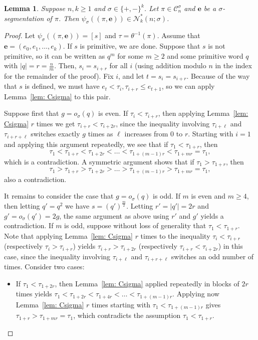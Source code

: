 \documentclass[12pt]{article}
\newcommand{\C}{\mathcal{C}}
\newcommand{\N}{\mathcal{N}}
\newcommand{\e}{\mathbf{e}}
\theoremstyle{plain}
\newtheorem{lemma}[theorem]{Lemma}
\theoremstyle{definition}
\begin{document}
\begin{lemma}\label{lem: psi}
Suppose $n,k\geq 1$ and $\sigma \in \{+,-\}^k$. Let $\pi \in \C_n^\sigma$ and $\e$ be a $\sigma$-segmentation of $\pi$. Then $\psi_\sigma((\pi,\e)) \in \N^*_k(n;\sigma)$. 
\end{lemma}
\begin{proof}
Let $\psi_\sigma((\pi,\e))=[s]$ and $\tau=\theta^{-1}(\pi)$.  Assume that $\e=(e_0,e_1,\ldots,e_k)$.  If $s$ is primitive, we are done. Suppose that $s$ is not primitive, so it can be written as $q^m$ for some $m\ge 2$ and some primitive word $q$ with $|q|=r=\frac{n}{m}$.
Then, $s_i = s_{i+r}$ for all $i$ (using addition modulo $n$ in the index for the remainder of the proof). %
Fix $i$, and let $t=s_i = s_{i+r}$. Because of the way that $s$ is defined, we must have $e_t< \tau_i,\tau_{i+r}\leq e_{t+1}$, so we can apply Lemma~\ref{lem: Csigma} to this pair.

Suppose first that $g=o_\sigma(q)$ is even.
If $\tau_i<\tau_{i+r}$, then applying Lemma~\ref{lem: Csigma} $r$ times we get $\tau_{i+r}<\tau_{i+2r}$,
since the inequality involving $\tau_{i+\ell}$ and $\tau_{i+r+\ell}$ switches exactly $g$ times as $\ell$ increases from $0$ to $r$.  Starting with $i=1$ and applying this argument repeatedly, we see that if $\tau_1<\tau_{1+r}$, then
$$\tau_1<\tau_{1+r}<\tau_{1+2r}<\dots <\tau_{1+(m-1)r}<\tau_{1+mr}=\tau_1,$$ which is a contradiction.
A symmetric argument shows that if $\tau_1>\tau_{1+r}$, then $$\tau_1>\tau_{1+r}>\tau_{1+2r}>\dots >\tau_{1+(m-1)r}>\tau_{1+mr}=\tau_1,$$ also a contradiction.

It remains to consider the case that $g=o_\sigma(q)$ is odd. If $m$ is even and $m\ge4$, then letting $q' = q^2$ we have $s = (q')^{\frac{m}{2}}$.
Letting $r'=|q'|=2r$ and $g'= o_\sigma(q')=2g$, the same argument as above using $r'$ and $g'$ yields a contradiction.
If $m$ is odd, suppose without loss of generality that $\tau_1<\tau_{1+r}$.
Note that applying Lemma~\ref{lem: Csigma} $r$ times to the inequality $\tau_i<\tau_{i+r}$ (respectively $\tau_i>\tau_{i+r}$) yields $\tau_{i+r}>\tau_{i+2r}$ (respectively $\tau_{i+r}<\tau_{i+2r}$) in this case, since the inequality involving $\tau_{i+\ell}$ and $\tau_{i+r+\ell}$ switches an odd number of times.
Consider two cases:
\begin{itemize}
\item If $\tau_{1}<\tau_{1+2r}$, then Lemma~\ref{lem: Csigma} applied repeatedly in blocks of $2r$ times yields $\tau_1<\tau_{1+2r}<\tau_{1+4r}<\dots< \tau_{1+(m-1)r}$.
Applying now Lemma~\ref{lem: Csigma} $r$ times starting with $\tau_1<\tau_{1+(m-1)r}$ gives $\tau_{1+r}>\tau_{1+mr}=\tau_1$, which contradicts the assumption $\tau_1<\tau_{1+r}$.


\end{itemize}
\end{proof}
\end{document}
